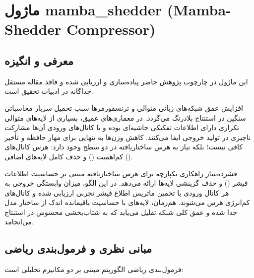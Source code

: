 \section{ماژول mamba\_shedder (Mamba-Shedder Compressor)}
\label{sec:module_mamba_shedder}

\subsection{معرفی و انگیزه}
این ماژول در چارچوب پژوهش حاضر پیاده‌سازی و ارزیابی شده و فاقد مقاله مستقل جداگانه در ادبیات تحقیق است.

افزایش عمق شبکه‌های زبانی متوالی و ترنسفورمرها سبب تحمیل سربار محاسباتی سنگین در استنتاج بلادرنگ می‌گردد. در معماری‌های عمیق، بسیاری از لایه‌های متوالی تکراری دارای اطلاعات تفکیکی حاشیه‌ای بوده و یا کانال‌های ورودی آن‌ها مشارکت ناچیزی در تولید خروجی ایفا می‌کنند. کاهش وزن‌ها به تنهایی برای مهار حافظه و تأخیر کافی نیست؛ بلکه نیاز به هرس ساختاریافته در دو سطح وجود دارد: هرس کانال‌های کم‌اهمیت () و حذف کامل لایه‌های اضافی ().

فشرده‌ساز  راهکاری یکپارچه برای هرس ساختاریافته مبتنی بر حساسیت اطلاعات فیشر () و حذف گزینشی لایه‌ها ارائه می‌دهد. در این الگو، میزان وابستگی خروجی به هر کانال ورودی با تخمین ماتریس اطلاع فیشر تجربی ارزیابی شده و کانال‌های کم‌انرژی هرس می‌شوند. هم‌زمان، لایه‌های با حساسیت باقیمانده اندک از ساختار مدل جدا شده و عمق کلی شبکه تقلیل می‌یابد که به شتاب‌بخشی محسوس در استنتاج می‌انجامد.

\subsection{مبانی نظری و فرمول‌بندی ریاضی}
فرمول‌بندی ریاضی الگوریتم  مبتنی بر دو مکانیزم تحلیلی است:

